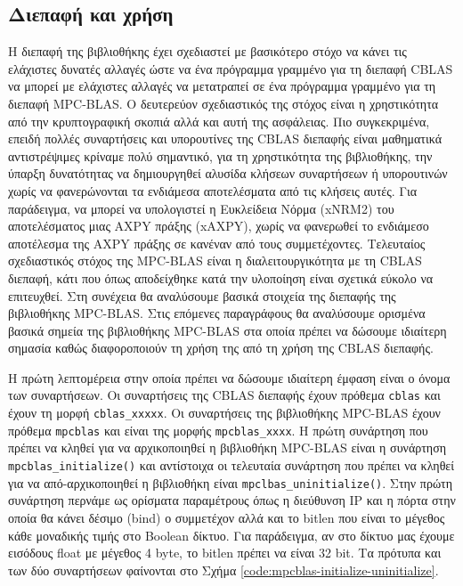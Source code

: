\subsection{Διεπαφή και χρήση}

Η διεπαφή της βιβλιοθήκης έχει σχεδιαστεί με βασικότερο στόχο να κάνει τις ελάχιστες δυνατές αλλαγές ώστε να ένα πρόγραμμα γραμμένο για τη διεπαφή CBLAS να μπορεί με ελάχιστες αλλαγές να μετατραπεί σε ένα πρόγραμμα γραμμένο για τη διεπαφή MPC-BLAS. Ο δευτερεύον σχεδιαστικός της στόχος είναι η χρηστικότητα από την κρυπτογραφική σκοπιά αλλά και αυτή της ασφάλειας. Πιο συγκεκριμένα, επειδή πολλές συναρτήσεις και υπορουτίνες της CBLAS διεπαφής είναι μαθηματικά αντιστρέψιμες κρίναμε πολύ σημαντικό, για τη χρηστικότητα της βιβλιοθήκης, την ύπαρξη δυνατότητας να δημιουργηθεί αλυσίδα κλήσεων συναρτήσεων ή υπορουτινών χωρίς να φανερώνονται τα ενδιάμεσα αποτελέσματα από τις κλήσεις αυτές. Για παράδειγμα, να μπορεί να υπολογιστεί η Ευκλείδεια Νόρμα (xNRM2) του αποτελέσματος μιας AXPY πράξης (xAXPY), χωρίς να φανερωθεί το ενδιάμεσο αποτέλεσμα της AXPY πράξης σε κανέναν από τους συμμετέχοντες. Τελευταίος σχεδιαστικός στόχος της MPC-BLAS είναι η διαλειτουργικότητα με τη CBLAS διεπαφή, κάτι που όπως αποδείχθηκε κατά την υλοποίηση είναι σχετικά εύκολο να επιτευχθεί. Στη συνέχεια θα αναλύσουμε βασικά στοιχεία της διεπαφής της βιβλιοθήκης MPC-BLAS. Στις επόμενες παραγράφους θα αναλύσουμε ορισμένα βασικά σημεία της βιβλιοθήκης MPC-BLAS στα οποία πρέπει να δώσουμε ιδιαίτερη σημασία καθώς διαφοροποιούν τη χρήση της από τη χρήση της CBLAS διεπαφής.

Η πρώτη λεπτομέρεια στην οποία πρέπει να δώσουμε ιδιαίτερη έμφαση είναι ο όνομα των συναρτήσεων. Οι συναρτήσεις της CBLAS διεπαφής έχουν πρόθεμα \texttt{cblas} και έχουν τη μορφή \texttt{cblas_xxxxx}. Οι συναρτήσεις της βιβλιοθήκης MPC-BLAS έχουν πρόθεμα \texttt{mpcblas} και είναι της μορφής \texttt{mpcblas_xxxx}. Η πρώτη συνάρτηση που πρέπει να κληθεί για να αρχικοποιηθεί η βιβλιοθήκη MPC-BLAS είναι η συνάρτηση \texttt{mpcblas_initialize()} και αντίστοιχα οι τελευταία συνάρτηση που πρέπει να κληθεί για να από-αρχικοποιηθεί η βιβλιοθήκη είναι \texttt{mpclbas_uninitialize()}. Στην πρώτη συνάρτηση περνάμε ως ορίσματα παραμέτρους όπως η διεύθυνση IP και η πόρτα στην οποία θα κάνει δέσιμο (bind) ο συμμετέχον αλλά και το bitlen που είναι το μέγεθος κάθε μοναδικής τιμής στο Boolean δίκτυο. Για παράδειγμα, αν στο δίκτυο μας έχουμε εισόδους float με μέγεθος 4 byte, το bitlen πρέπει να είναι 32 bit. Τα πρότυπα και των δύο συναρτήσεων φαίνονται στο Σχήμα \ref{code:mpcblas-initialize-uninitialize}.


